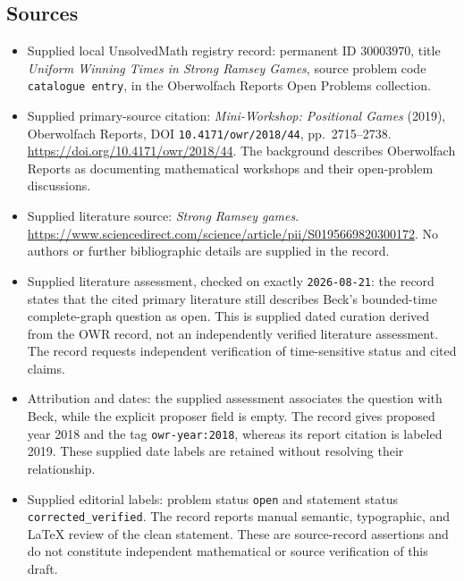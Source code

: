 \documentclass[11pt]{article}
\begin{document}
\subsection{Sources}
\begin{itemize}
\item Supplied local UnsolvedMath registry record: permanent ID \(30003970\), title \emph{Uniform Winning Times in Strong Ramsey Games}, source problem code \texttt{catalogue entry}, in the Oberwolfach Reports Open Problems collection.
\item Supplied primary-source citation: \emph{Mini-Workshop: Positional Games} (2019), Oberwolfach Reports, DOI \texttt{10.4171/owr/2018/44}, pp.\ 2715--2738. \url{https://doi.org/10.4171/owr/2018/44}. The background describes Oberwolfach Reports as documenting mathematical workshops and their open-problem discussions.
\item Supplied literature source: \emph{Strong Ramsey games}. \url{https://www.sciencedirect.com/science/article/pii/S0195669820300172}. No authors or further bibliographic details are supplied in the record.
\item Supplied literature assessment, checked on exactly \texttt{2026-08-21}: the record states that the cited primary literature still describes Beck's bounded-time complete-graph question as open. This is supplied dated curation derived from the OWR record, not an independently verified literature assessment. The record requests independent verification of time-sensitive status and cited claims.
\item Attribution and dates: the supplied assessment associates the question with Beck, while the explicit proposer field is empty. The record gives proposed year 2018 and the tag \texttt{owr-year:2018}, whereas its report citation is labeled 2019. These supplied date labels are retained without resolving their relationship.
\item Supplied editorial labels: problem status \texttt{open} and statement status \texttt{corrected\_verified}. The record reports manual semantic, typographic, and LaTeX review of the clean statement. These are source-record assertions and do not constitute independent mathematical or source verification of this draft.
\end{itemize}
\end{document}
